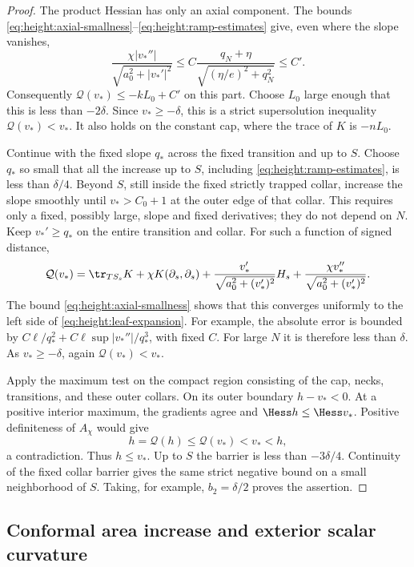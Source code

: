 \begin{proof}
The product Hessian has only an axial component.  The bounds
\eqref{eq:height:axial-smallness}--\eqref{eq:height:ramp-estimates}
give, even where the slope vanishes,
\[
 \frac{\chi|v_*''|}{\sqrt{a_0^2+|v_*'|^2}}
 \le C\frac{q_N+\eta}{\sqrt{(\eta/e)^2+q_N^2}}\le C'.
\]
Consequently $\mathcal Q(v_*)\le-kL_0+C'$ on this part.  Choose
$L_0$ large enough that this is less than $-2\delta$.  Since
$v_*\ge-\delta$, this is a strict supersolution inequality
$\mathcal Q(v_*)<v_*$.  It also holds on the constant cap, where the
trace of $K$ is $-nL_0$.

Continue with the fixed slope $q_*$ across the fixed transition and up
to $S$.  Choose $q_*$ so small that all the increase up to $S$, including
\eqref{eq:height:ramp-estimates}, is less than $\delta/4$.
Beyond $S$, still inside the fixed strictly trapped collar, increase the
slope smoothly until $v_*>C_0+1$ at the outer edge of that collar.  This
requires only a fixed, possibly large, slope and fixed derivatives;
they do not depend on $N$.  Keep $v_*'\ge q_*$ on the entire transition
and collar.  For such a function of signed distance,
\[
 \mathcal Q(v_*)=
 \tr_{TS_s}K+\chi K(\partial_s,\partial_s)
 +\frac{v_*'}{\sqrt{a_0^2+(v_*')^2}}H_s
 +\frac{\chi v_*''}{\sqrt{a_0^2+(v_*')^2}}.
\]
The bound \eqref{eq:height:axial-smallness} shows that this converges
uniformly to the left side of \eqref{eq:height:leaf-expansion}.
For example, the absolute error is bounded by
$C\ell/q_*^2+C\ell\sup|v_*''|/q_*^3$, with fixed $C$.
For large $N$ it is therefore less than $\delta$.  As
$v_*\ge-\delta$, again $\mathcal Q(v_*)<v_*$.

Apply the maximum test on the compact region consisting of the cap,
necks, transitions, and these outer collars.  On its outer boundary
$h-v_*<0$.  At a positive interior maximum, the gradients agree and
$\Hess h\le\Hess v_*$.  Positive definiteness of $A_\chi$ would give
\[
 h=\mathcal Q(h)\le\mathcal Q(v_*)<v_*<h,
\]
a contradiction.  Thus $h\le v_*$.  Up to $S$ the barrier is less
than $-3\delta/4$.  Continuity of the fixed collar barrier gives the
same strict negative bound on a small neighborhood of $S$.  Taking,
for example, $b_2=\delta/2$ proves the assertion.
\end{proof}

\subsection{Conformal area increase and exterior scalar curvature}
\label{subsec:height:conformal}

